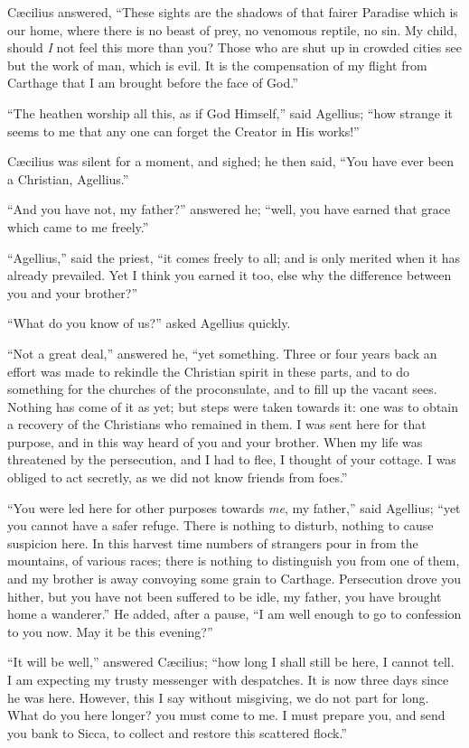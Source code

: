 Cæcilius answered, ``These sights are the shadows of that
fairer Paradise which is our home, where there is no beast of prey, no
venomous reptile, no sin. My child, should \emph{I} not feel this more
than you? Those who are shut up in crowded cities see but the work of
man, which is evil. It is the compensation of my flight from Carthage
that I am brought before the face of God.''

``The heathen worship all this, as if God Himself,'' said
Agellius; ``how strange it seems to me that any one can forget the
Creator in His works!''

Cæcilius was silent for a moment, and sighed; he then said,
``You have ever been a Christian, Agellius.''

``And you have not, my father?'' answered he; ``well,
you have earned that grace which came to me freely.''

``Agellius,'' said the priest, ``it comes freely to
all; and is only merited when it has already prevailed. Yet I
think you earned it too, else why the difference between you and your
brother?''

``What do you know of us?'' asked Agellius quickly.

``Not a great deal,'' answered he, ``yet something.
Three or four years back an effort was made to rekindle the Christian
spirit in these parts, and to do something for the churches of the
proconsulate, and to fill up the vacant sees. Nothing has come of it
as yet; but steps were taken towards it: one was to obtain a recovery
of the Christians who remained in them. I was sent here for that
purpose, and in this way heard of you and your brother. When my life
was threatened by the persecution, and I had to flee, I thought of
your cottage. I was obliged to act secretly, as we did not know
friends from foes.''

``You were led here for other purposes towards \emph{me}, my
father,'' said Agellius; ``yet you cannot have a safer refuge.
There is nothing to disturb, nothing to cause suspicion here. In this
harvest time numbers of strangers pour in from the mountains, of
various races; there is nothing to distinguish you from one of them,
and my brother is away convoying some grain to Carthage. Persecution
drove you hither, but you have not been suffered to be idle, my
father, you have brought home a wanderer.'' He added, after a
pause, ``I am well enough to go to confession to you now. May it
be this evening?''

``It will be well,'' answered Cæcilius; ``how long I
shall still be here, I cannot tell. I am expecting my trusty
messenger with despatches. It is now three days since he was here.
However, this I say without misgiving, we do not part for long. What
do you here longer? you must come to me. I must prepare you, and send
you bank to Sicca, to collect and restore this scattered flock.''

